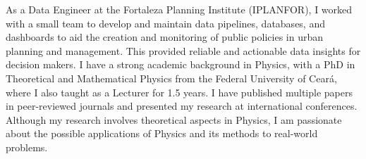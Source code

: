 \documentclass[10pt,a4paper,ragged2e,withhyper]{altacv}
\begin{document}

\makecvheader
\begin{justify}
  {\small %
    As a Data Engineer at the Fortaleza Planning Institute (IPLANFOR), I worked with a small team to develop and maintain data pipelines, databases, and dashboards to aid the creation and monitoring of public policies in urban planning and management. This provided reliable and actionable data insights for decision makers. I have a strong academic background in Physics, with a PhD in Theoretical and Mathematical Physics from the Federal University of Ceará, where I also taught as a Lecturer for 1.5 years. I have published multiple papers in peer-reviewed journals and presented my research at international conferences. Although my research involves theoretical aspects in Physics, I am passionate about the possible applications of Physics and its methods to real-world problems.%
  }
\end{justify}


\end{document}
